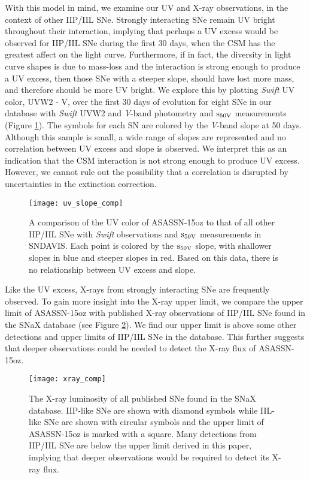 \documentclass[a4paper,fleqn,usenatbib]{mnras}
\begin{document}
With this model in mind, we examine our UV and X-ray observations, in the context of other IIP/IIL SNe.
Strongly interacting SNe remain UV bright throughout their interaction, implying that perhaps a UV excess would be observed for IIP/IIL SNe during the first 30 days, when the CSM has the greatest affect on the light curve.
Furthermore, if in fact, the diversity in light curve shapes is due to mass-loss and the interaction is strong enough to produce a UV excess, then those SNe with a steeper slope, should have lost more mass, and therefore should be more UV bright.
We explore this by plotting {\it Swift} UV color, UVW2 - V, over the first 30 days of evolution for eight SNe in our database with {\it Swift} UVW2 and {\it V}-band photometry and $\rm{s_{50V}}$ measurements (Figure \ref{fig:UVColor}). 
The symbols for each SN are colored by the {\it V}-band slope at 50 days. 
Although this sample is small, a wide range of slopes are represented and no correlation between UV excess and slope is observed.
We interpret this as an indication that the CSM interaction is not strong enough to produce UV excess.
However, we cannot rule out the possibility that a correlation is disrupted by uncertainties in the extinction correction.
\begin{figure}
\begin{center}
\texttt{[image: uv\_slope\_comp]} %
\caption{A comparison of the UV color of ASASSN-15oz to that of all other IIP/IIL SNe with \textit{Swift} observations and $\rm{s_{50V}}$ measurements in SNDAVIS.
Each point is colored by the $\rm{s_{50V}}$ slope, with shallower slopes in blue and steeper slopes in red. 
Based on this data, there is no relationship between UV excess and slope.}
\label{fig:UVColor}
\end{center}
\end{figure}

Like the UV excess, X-rays from strongly interacting SNe are frequently observed.
To gain more insight into the X-ray upper limit, we compare the upper limit of ASASSN-15oz with published X-ray observations of IIP/IIL SNe found in the SNaX database \citep{2017ross} (see Figure \ref{fig:xray}).
We find our upper limit is above some other detections and upper limits of IIP/IIL SNe in the database.
This further suggests that deeper observations could be needed to detect the X-ray flux of ASASSN-15oz.
\begin{figure}
\begin{center}
\texttt{[image: xray\_comp]} %
\caption{The X-ray luminosity of all published SNe found in the SNaX database. 
IIP-like SNe are shown with diamond symbols while IIL-like SNe are shown with circular symbols and the upper limit of ASASSN-15oz is marked with a square.
Many detections from IIP/IIL SNe are below the upper limit derived in this paper, implying that deeper observations would be required to detect its X-ray flux.}
\label{fig:xray}
\end{center}
\end{figure}
\end{document}
